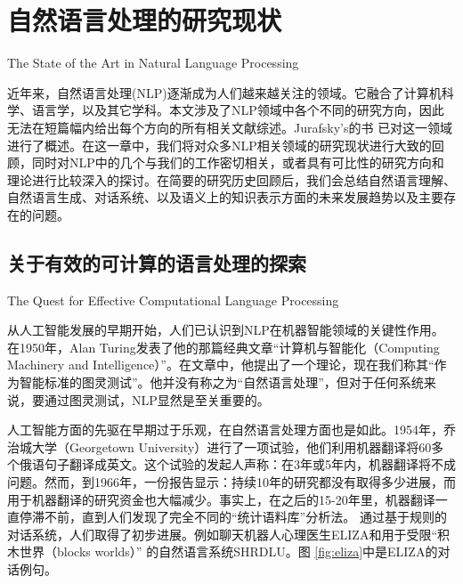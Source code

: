 \chapter{自然语言处理的研究现状}{The State of the Art in Natural Language Processing}
\label{chap:review}

     近年来，自然语言处理(NLP)逐渐成为人们越来越关注的领域。它融合了计算机科学、语言学，以及其它学科。本文涉及了NLP领域中各个不同的研究方向，因此无法在短篇幅内给出每个方向的所有相关文献综述。Jurafsky’s的书 \cite{Jurafsky2009}已对这一领域进行了概述。在这一章中，我们将对众多NLP相关领域的研究现状进行大致的回顾，同时对NLP中的几个与我们的工作密切相关，或者具有可比性的研究方向和理论进行比较深入的探讨。在简要的研究历史回顾后，我们会总结自然语言理解、自然语言生成、对话系统、以及语义上的知识表示方面的未来发展趋势以及主要存在的问题。

\section{关于有效的可计算的语言处理的探索}{The Quest for Effective Computational Language Processing}

      从人工智能发展的早期开始，人们已认识到NLP在机器智能领域的关键性作用。在1950年，Alan Turing发表了他的那篇经典文章“计算机与智能化（Computing  Machinery and Intelligence）”。在文章中，他提出了一个理论，现在我们称其“作为智能标准的图灵测试”。他并没有称之为“自然语言处理”，但对于任何系统来说，要通过图灵测试，NLP显然是至关重要的。

人工智能方面的先驱在早期过于乐观，在自然语言处理方面也是如此。1954年，乔治城大学（Georgetown University）进行了一项试验，他们利用机器翻译将60多个俄语句子翻译成英文。这个试验的发起人声称：在3年或5年内，机器翻译将不成问题。然而，到1966年，一份报告显示：持续10年的研究都没有取得多少进展，而用于机器翻译的研究资金也大幅减少。事实上，在之后的15-20年里，机器翻译一直停滞不前，直到人们发现了完全不同的“统计语料库”分析法。
通过基于规则的对话系统，人们取得了初步进展。例如聊天机器人心理医生ELIZA\cite{Weizenbaum1966}和用于受限“积木世界（blocks worlds）” 的自然语言系统SHRDLU\cite{Winograd1972}。图 \ref{fig:eliza}中是ELIZA的对话例句。

